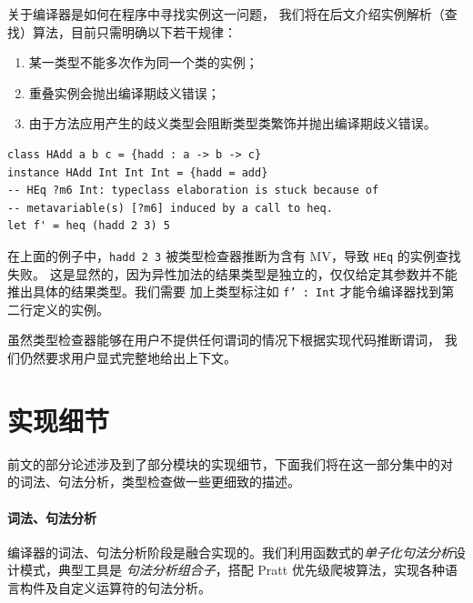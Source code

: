关于编译器是如何在程序中寻找实例这一问题，
我们将在后文介绍实例解析（查找）算法，目前只需明确以下若干规律：
\vspace{-1em}
\begin{enumerate}\itemsep-.5em
  \item 某一类型不能多次作为同一个类的实例；
  \item 重叠实例会抛出编译期歧义错误；
  \item 由于方法应用产生的歧义类型会阻断类型类繁饰并抛出编译期歧义错误。
\end{enumerate}
\vspace{-1em}
\begin{verbatim}
class HAdd a b c = {hadd : a -> b -> c}
instance HAdd Int Int Int = {hadd = add}
-- HEq ?m6 Int: typeclass elaboration is stuck because of
-- metavariable(s) [?m6] induced by a call to heq.
let f' = heq (hadd 2 3) 5
\end{verbatim}
在上面的例子中，\texttt{hadd 2 3} 被类型检查器推断为含有 MV，导致 \texttt{HEq} 的实例查找失败。
这是显然的，因为异性加法的结果类型是独立的，仅仅给定其参数并不能推出具体的结果类型。我们需要
加上类型标注如 \texttt{f' : Int} 才能令编译器找到第二行定义的实例。

虽然类型检查器能够在用户不提供任何谓词的情况下根据实现代码推断谓词，
我们仍然要求用户显式完整地给出上下文。

\section{实现细节}
前文的部分论述涉及到了部分模块的实现细节，下面我们将在这一部分集中的对 \Tigris 的词法、句法分析，类型检查做一些更细致的描述。
\paragraph{词法、句法分析} 编译器的词法、句法分析阶段是融合实现的。我们利用函数式的\emph{单子化句法分析}设计模式，典型工具是
\emph{句法分析组合子}，搭配 Pratt 优先级爬坡算法，实现各种语言构件及自定义运算符的句法分析。

